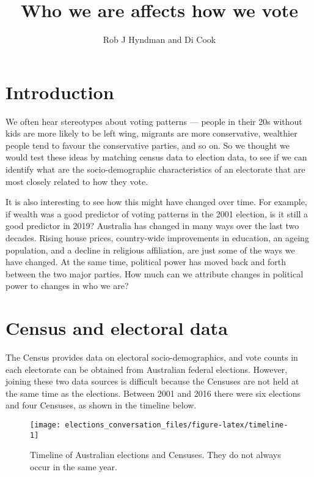 \documentclass[11pt,a4paper,]{article}
\title{Who we are affects how we vote}
\author{Rob J Hyndman and Di Cook}
\date{}
\begin{document}
\maketitle

\hypertarget{intro}{%
\section{Introduction}\label{intro}}

We often hear stereotypes about voting patterns --- people in their 20s without kids are more likely to be left wing, migrants are more conservative, wealthier people tend to favour the conservative parties, and so on. So we thought we would test these ideas by matching census data to election data, to see if we can identify what are the socio-demographic characteristics of an electorate that are most closely related to how they vote.

It is also interesting to see how this might have changed over time. For example, if wealth was a good predictor of voting patterns in the 2001 election, is it still a good predictor in 2019? Australia has changed in many ways over the last two decades. Rising house prices, country-wide improvements in education, an ageing population, and a decline in religious affiliation, are just some of the ways we have changed. At the same time, political power has moved back and forth between the two major parties. How much can we attribute changes in political power to changes in who we are?

\hypertarget{census-and-electoral-data}{%
\section{Census and electoral data}\label{census-and-electoral-data}}

The Census provides data on electoral socio-demographics, and vote counts in each electorate can be obtained from Australian federal elections. However, joining these two data sources is difficult because the Censuses are not held at the same time as the elections. Between 2001 and 2016 there were six elections and four Censuses, as shown in the timeline below.

\begin{figure}[H]

{\centering \texttt{[image: elections\_conversation\_files/figure-latex/timeline-1]} 

}

\caption{Timeline of Australian elections and Censuses. They do not always occur in the same year.}\label{fig:timeline}
\end{figure}
\end{document}
